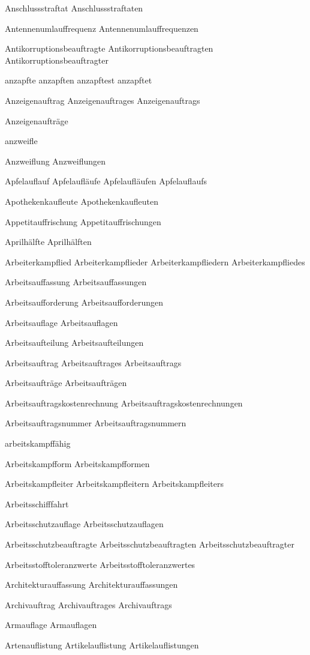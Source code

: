 Anschlussstraftat
Anschlussstraftaten

Antennenumlauffrequenz
Antennenumlauffrequenzen

Antikorruptionsbeauftragte
Antikorruptionsbeauftragten
Antikorruptionsbeauftragter

anzapfte
anzapften
anzapftest
anzapftet

Anzeigenauftrag
Anzeigenauftrages
Anzeigenauftrags

Anzeigenaufträge

anzweifle

Anzweiflung
Anzweiflungen

Apfelauflauf
Apfelaufläufe
Apfelaufläufen
Apfelauflaufs

Apothekenkaufleute
Apothekenkaufleuten

Appetitauffrischung
Appetitauffrischungen

Aprilhälfte
Aprilhälften

Arbeiterkampflied
Arbeiterkampflieder
Arbeiterkampfliedern
Arbeiterkampfliedes

Arbeitsauffassung
Arbeitsauffassungen

Arbeitsaufforderung
Arbeitsaufforderungen

Arbeitsauflage
Arbeitsauflagen

Arbeitsaufteilung
Arbeitsaufteilungen

Arbeitsauftrag
Arbeitsauftrages
Arbeitsauftrags

Arbeitsaufträge
Arbeitsaufträgen

Arbeitsauftragskostenrechnung
Arbeitsauftragskostenrechnungen

Arbeitsauftragsnummer
Arbeitsauftragsnummern

arbeitskampffähig

Arbeitskampfform
Arbeitskampfformen

Arbeitskampfleiter
Arbeitskampfleitern
Arbeitskampfleiters

Arbeitsschifffahrt

Arbeitsschutzauflage
Arbeitsschutzauflagen

Arbeitsschutzbeauftragte
Arbeitsschutzbeauftragten
Arbeitsschutzbeauftragter

Arbeitsstofftoleranzwerte
Arbeitsstofftoleranzwertes

Architekturauffassung
Architekturauffassungen

Archivauftrag
Archivauftrages
Archivauftrags

Armauflage
Armauflagen

Artenauflistung
Artikelauflistung
Artikelauflistungen

